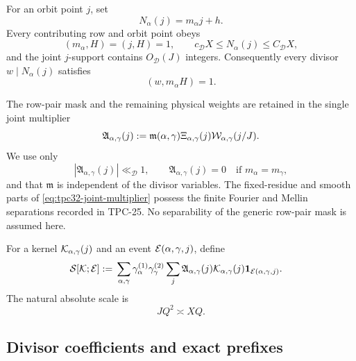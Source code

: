 For an orbit point \(j\), set
\begin{equation}
 N_\alpha(j)=m_\alpha j+h.
 \label{eq:tpc32-target}
\end{equation}
Every contributing row and orbit point obeys
\begin{equation}
 (m_\alpha,H)=(j,H)=1,
 \qquad
 c_{\mathscr D}X\le N_\alpha(j)\le C_{\mathscr D}X,
 \label{eq:tpc32-primitive-target-support}
\end{equation}
and the joint \(j\)-support contains \(O_{\mathscr D}(J)\) integers.
Consequently every divisor \(w\mid N_\alpha(j)\) satisfies
\begin{equation}
 (w,m_\alpha H)=1.
 \label{eq:tpc32-target-divisor-primitivity}
\end{equation}

The row-pair mask and the remaining physical weights are retained in
the single joint multiplier
\begin{equation}
 \mathfrak A_{\alpha,\gamma}(j)
 :=\mathfrak m(\alpha,\gamma)
   \Xi_{\alpha,\gamma}(j)
   \mathcal W_{\alpha,\gamma}(j/J).
 \label{eq:tpc32-joint-multiplier}
\end{equation}
We use only
\begin{equation}
 |\mathfrak A_{\alpha,\gamma}(j)|\ll_{\mathscr D}1,
 \qquad
 \mathfrak A_{\alpha,\gamma}(j)=0
 \quad\text{if }m_\alpha=m_\gamma,
 \label{eq:tpc32-joint-multiplier-bound}
\end{equation}
and that \(\mathfrak m\) is independent of the divisor variables.  The
fixed-residue and smooth parts of
\eqref{eq:tpc32-joint-multiplier} possess the finite Fourier and Mellin
separations recorded in TPC-25.  No separability of the generic
row-pair mask is assumed here.

For a kernel \(\mathcal K_{\alpha,\gamma}(j)\) and an event
\(\mathcal E(\alpha,\gamma,j)\), define
\begin{align}
 \mathcal S[\mathcal K;\mathcal E]
 :={}&\sum_{\alpha,\gamma}
 \gamma_\alpha^{(1)}\gamma_\gamma^{(2)}
 \sum_j\mathfrak A_{\alpha,\gamma}(j)
 \mathcal K_{\alpha,\gamma}(j)
 \mathbf 1_{\mathcal E(\alpha,\gamma,j)}.
 \label{eq:tpc32-physical-functional}
\end{align}
The natural absolute scale is
\begin{equation}
 JQ^2\asymp XQ.
 \label{eq:tpc32-natural-scale}
\end{equation}

\subsection{Divisor coefficients and exact prefixes}

